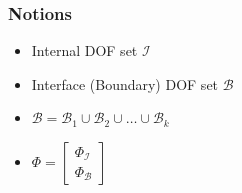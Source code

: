 \documentclass[serif,mathserif, 12pt]{beamer}
\begin{document}
\begin{frame}
  \frametitle{Notions}
  \begin{itemize}
  \item Internal DOF set $\mathcal{I}$
  \item Interface (Boundary) DOF set $\mathcal{B}$
  \item $\mathcal{B} = \mathcal{B}_1\cup\mathcal{B}_2\cup \dots \cup \mathcal{B}_k$
  \item $\Phi = \begin{bmatrix}
    \Phi_\mathcal{I} \\
    \Phi_\mathcal{B}
  \end{bmatrix}$
  \end{itemize}
\end{frame}
\end{document}
